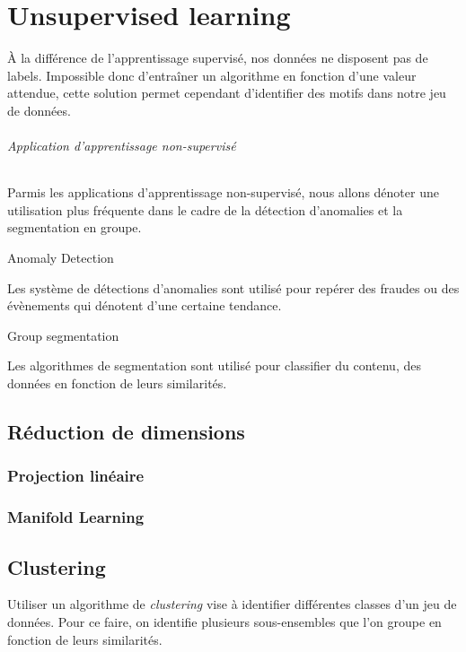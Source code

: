 \documentclass[../../cs-notes.tex]{subfiles}
\begin{document}
	
	
	
	
	
	
	
	
	
	

	\part{Unsupervised learning}

	À la différence de l'apprentissage supervisé, nos données ne disposent pas de labels.
	Impossible donc d'entraîner un algorithme en fonction d'une valeur attendue, cette solution permet cependant d'identifier des motifs dans notre jeu de données.

	\paragraph{Application d'apprentissage non-supervisé}
	Parmis les applications d'apprentissage non-supervisé, nous allons dénoter une utilisation plus fréquente dans le cadre de la détection d'anomalies et la segmentation en groupe.

	\subparagraph{Anomaly Detection} Les système de détections d'anomalies sont utilisé pour repérer des fraudes ou des évènements qui dénotent d'une certaine tendance.

	\subparagraph{Group segmentation}
	Les algorithmes de segmentation sont utilisé pour classifier du contenu, des données en fonction de leurs similarités.

	\chapter{Réduction de dimensions}
	\section{Projection linéaire}
	\section{Manifold Learning}


	\chapter{Clustering}
	Utiliser un algorithme de \textit{clustering} vise à identifier différentes classes d'un jeu de données.
	Pour ce faire, on identifie plusieurs sous-ensembles que l'on groupe en fonction de leurs similarités.
\end{document}
